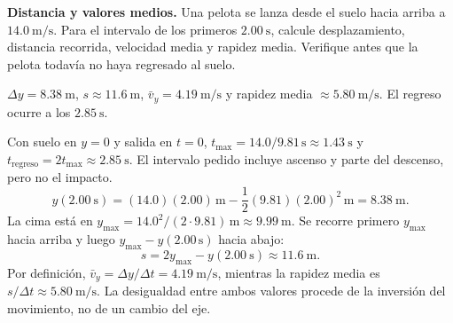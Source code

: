 \begin{ejercicio}
\textbf{Distancia y valores medios.} Una pelota se lanza desde el suelo hacia arriba a \(\SI{14.0}{\meter\per\second}\). Para el intervalo de los primeros \(\SI{2.00}{\second}\), calcule desplazamiento, distancia recorrida, velocidad media y rapidez media. Verifique antes que la pelota todavía no haya regresado al suelo.
\end{ejercicio}
\begin{respuesta}
\(\Delta y=\SI{8.38}{\meter}\), \(s\approx\SI{11.6}{\meter}\), \(\bar v_y=\SI{4.19}{\meter\per\second}\) y rapidez media \(\approx\SI{5.80}{\meter\per\second}\). El regreso ocurre a los \(\SI{2.85}{\second}\).
\end{respuesta}
\begin{explicacion}
Con suelo en \(y=0\) y salida en \(t=0\), \(t_{\max}=14.0/9.81\,\si{\second}\approx\SI{1.43}{\second}\) y \(t_{\text{regreso}}=2t_{\max}\approx\SI{2.85}{\second}\). El intervalo pedido incluye ascenso y parte del descenso, pero no el impacto.
\[ y(\SI{2.00}{\second})=(14.0)(2.00)\,\si{\meter}-\frac12(9.81)(2.00)^2\,\si{\meter}=\SI{8.38}{\meter}. \]
La cima está en \(y_{\max}=14.0^2/(2\cdot9.81)\,\si{\meter}\approx\SI{9.99}{\meter}\). Se recorre primero \(y_{\max}\) hacia arriba y luego \(y_{\max}-y(2.00\,\si{\second})\) hacia abajo:
\[ s=2y_{\max}-y(\SI{2.00}{\second})\approx\SI{11.6}{\meter}. \]
Por definición, \(\bar v_y=\Delta y/\Delta t=\SI{4.19}{\meter\per\second}\), mientras la rapidez media es \(s/\Delta t\approx\SI{5.80}{\meter\per\second}\). La desigualdad entre ambos valores procede de la inversión del movimiento, no de un cambio del eje.
\end{explicacion}


